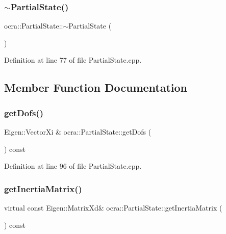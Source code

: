 \subsubsection{\texorpdfstring{$\sim$\+Partial\+State()}{~PartialState()}}
{\footnotesize\ttfamily ocra\+::\+Partial\+State\+::$\sim$\+Partial\+State (\begin{DoxyParamCaption}{ }\end{DoxyParamCaption})\hspace{0.3cm}{\ttfamily [pure virtual]}}



Definition at line 77 of file Partial\+State.\+cpp.



\subsection{Member Function Documentation}
\hypertarget{classocra_1_1PartialState_a969bb0d941f73df7da78aba4339908c4}{}\label{classocra_1_1PartialState_a969bb0d941f73df7da78aba4339908c4} 
\subsubsection{\texorpdfstring{get\+Dofs()}{getDofs()}}
{\footnotesize\ttfamily Eigen\+::\+Vector\+Xi \& ocra\+::\+Partial\+State\+::get\+Dofs (\begin{DoxyParamCaption}{ }\end{DoxyParamCaption}) const\hspace{0.3cm}{\ttfamily [protected]}}



Definition at line 96 of file Partial\+State.\+cpp.

\hypertarget{classocra_1_1PartialState_ad811a25932f0fad439242ebd48841162}{}\label{classocra_1_1PartialState_ad811a25932f0fad439242ebd48841162} 
\subsubsection{\texorpdfstring{get\+Inertia\+Matrix()}{getInertiaMatrix()}}
{\footnotesize\ttfamily virtual const Eigen\+::\+Matrix\+Xd\& ocra\+::\+Partial\+State\+::get\+Inertia\+Matrix (\begin{DoxyParamCaption}{ }\end{DoxyParamCaption}) const\hspace{0.3cm}{\ttfamily [pure virtual]}}



